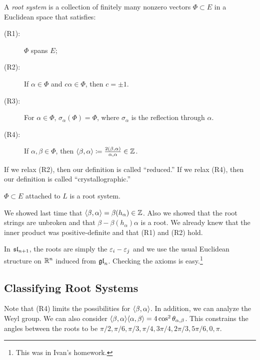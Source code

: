 \documentclass[twoside, 10pt]{article}
\begin{document}
    \begin{defn} A \textit{root system} is a collection of finitely many
        nonzero vectors $\Phi \subset E$ in a Euclidean space that satisfies:
        \begin{description} \item[(R1):] $\Phi$ spans $E$; \item[(R2):] If
            $\alpha \in \Phi$ and $c\alpha \in \Phi$, then $c = \pm 1$.
        \item[(R3):] For $\alpha \in \Phi$, $\sigma_{\alpha}(\Phi) = \Phi$,
            where $\sigma_{\alpha}$ is the reflection through $\alpha$.
        \item[(R4):] If $\alpha,\beta \in \Phi$, then $\langle\beta,\alpha\rangle
            \coloneqq \frac{2(\beta,\alpha)}{\alpha,\alpha} \in \mathbb{Z}$.
    \end{description} \end{defn}

    \begin{rmk} If we relax (R2), then our definition is called ``reduced.'' If
    we relax (R4), then our definition is called ``crystallographic.''
\end{rmk}

    \begin{prop} $\Phi \subset E$ attached to $L$ is a root system.  \end{prop}

    \begin{prop} We showed last time that $\langle\beta,\alpha\rangle =
        \beta(h_{\alpha}) \in \mathbb{Z}$. Also we showed that the root strings are
        unbroken and that $\beta - \beta(h_{\alpha})\alpha$ is a root. We
        already knew that the inner product was positive-definite and that (R1)
        and (R2) hold.  \end{prop}

    \begin{exm} In $\mathfrak{sl}_{n+1}$, the roots are simply the $\varepsilon_i-\varepsilon_j$ and
    we use the usual Euclidean structure on $\mathbb{R}^n$ induced from $\mathfrak{gl}_n$.
Checking the axioms is easy.\footnote{This was in Ivan's homework.} \end{exm}

    \subsection{Classifying Root Systems}%
    
    Note that (R4) limits the possibilities for $\langle\beta,\alpha\rangle$. In
    addition, we can analyze the Weyl group. We can also consider
    $\langle\beta,\alpha\rangle\langle\alpha,\beta\rangle = 4 \cos^2 \theta_{\alpha,\beta}$.
    This constrains the angles between the roots to be $\pi/2, \pi/6, \pi/3,
    \pi/4, 3\pi/4, 2\pi/3, 5\pi/6, 0, \pi$. 
\end{document}
